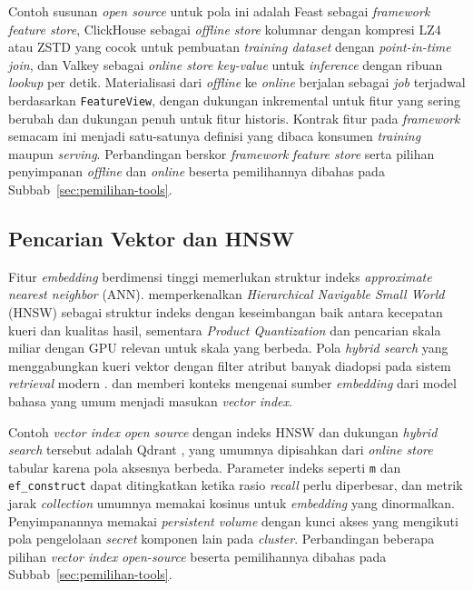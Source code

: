 Contoh susunan \textit{open source} untuk pola ini adalah Feast \autocite{feast2024} sebagai \textit{framework} \textit{feature store}, ClickHouse \autocite{clickhouse2024} sebagai \textit{offline store} kolumnar dengan kompresi LZ4 atau ZSTD yang cocok untuk pembuatan \textit{training dataset} dengan \textit{point-in-time join}, dan Valkey \autocite{valkey2025} sebagai \textit{online store} \textit{key-value} untuk \textit{inference} dengan ribuan \textit{lookup} per detik. Materialisasi dari \textit{offline} ke \textit{online} berjalan sebagai \textit{job} terjadwal berdasarkan \texttt{FeatureView}, dengan dukungan inkremental untuk fitur yang sering berubah dan dukungan penuh untuk fitur historis. Kontrak fitur pada \textit{framework} semacam ini menjadi satu-satunya definisi yang dibaca konsumen \textit{training} maupun \textit{serving}. Perbandingan berskor \textit{framework} \textit{feature store} serta pilihan penyimpanan \textit{offline} dan \textit{online} beserta pemilihannya dibahas pada Subbab~\ref{sec:pemilihan-tools}.

\subsection{Pencarian Vektor dan HNSW}
\label{subsec:vektor-hnsw}

Fitur \textit{embedding} berdimensi tinggi memerlukan struktur indeks \textit{approximate nearest neighbor} (ANN). \textcite{malkov2020efficient} memperkenalkan \textit{Hierarchical Navigable Small World} (HNSW) sebagai struktur indeks dengan keseimbangan baik antara kecepatan kueri dan kualitas hasil, sementara \textit{Product Quantization} \autocite{jegou2011product} dan pencarian skala miliar dengan GPU \autocite{johnson2021billion} relevan untuk skala yang berbeda. Pola \textit{hybrid search} yang menggabungkan kueri vektor dengan filter atribut banyak diadopsi pada sistem \textit{retrieval} modern \autocite{bruch2023hybrid}. \textcite{devlin2019bert} dan \textcite{openai2022embedding} memberi konteks mengenai sumber \textit{embedding} dari model bahasa yang umum menjadi masukan \textit{vector index}.

Contoh \textit{vector index} \textit{open source} dengan indeks HNSW dan dukungan \textit{hybrid search} tersebut adalah Qdrant \autocite{qdrant2025}, yang umumnya dipisahkan dari \textit{online store} tabular karena pola aksesnya berbeda. Parameter indeks seperti \texttt{m} dan \texttt{ef\_construct} dapat ditingkatkan ketika rasio \textit{recall} perlu diperbesar, dan metrik jarak \textit{collection} umumnya memakai kosinus untuk \textit{embedding} yang dinormalkan. Penyimpanannya memakai \textit{persistent volume} dengan kunci akses yang mengikuti pola pengelolaan \textit{secret} komponen lain pada \textit{cluster}. Perbandingan beberapa pilihan \textit{vector index} \textit{open-source} beserta pemilihannya dibahas pada Subbab~\ref{sec:pemilihan-tools}.

